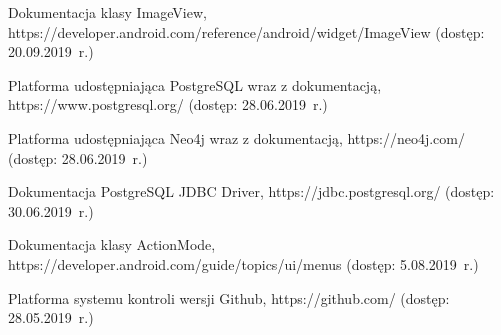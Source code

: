 \begin{thebibliography}{3}
   Dokumentacja klasy ImageView, https://developer.android.com/reference/android/widget/ImageView (dostęp: 20.09.2019~r.)
  
   Platforma udostępniająca PostgreSQL wraz z dokumentacją, https://www.postgresql.org/ (dostęp: 28.06.2019~r.)
  
   Platforma udostępniająca Neo4j wraz z dokumentacją, https://neo4j.com/ (dostęp: 28.06.2019~r.)
  
  Dokumentacja PostgreSQL JDBC Driver, https://jdbc.postgresql.org/ (dostęp: 30.06.2019~r.)
  
   Dokumentacja klasy ActionMode, https://developer.android.com/guide/topics/ui/menus (dostęp: 5.08.2019~r.)
  
   Platforma systemu kontroli wersji Github, https://github.com/ (dostęp: 28.05.2019~r.)

  
\end{thebibliography}